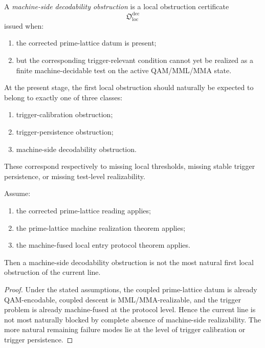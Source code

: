 \begin{definition}
\label{def:machine-side-decodability-obstruction}
A \emph{machine-side decodability obstruction} is a local obstruction certificate
\[
\mathfrak{O}_{\mathrm{loc}}^{\mathrm{dec}}
\]
issued when:
\begin{enumerate}
    \item the corrected prime-lattice datum is present;
    \item but the corresponding trigger-relevant condition cannot yet be realized as a finite machine-decidable test on the active QAM/MML/MMA state.
\end{enumerate}
\end{definition}

\begin{remark}
\label{rem:the-three-natural-first-obstruction-types}
At the present stage, the first local obstruction should naturally be expected to belong to exactly one of three classes:
\begin{enumerate}
    \item trigger-calibration obstruction;
    \item trigger-persistence obstruction;
    \item machine-side decodability obstruction.
\end{enumerate}
These correspond respectively to missing local thresholds, missing stable trigger persistence, or missing test-level realizability.
\end{remark}

\begin{proposition}
\label{prop:machine-side-decodability-not-primary-current-obstruction}
Assume:
\begin{enumerate}
    \item the corrected prime-lattice reading applies;
    \item the prime-lattice machine realization theorem applies;
    \item the machine-fused local entry protocol theorem applies.
\end{enumerate}
Then a machine-side decodability obstruction is not the most natural first local obstruction of the current line.
\end{proposition}

\begin{proof}
Under the stated assumptions, the coupled prime-lattice datum is already QAM-encodable, coupled descent is MML/MMA-realizable, and the trigger problem is already machine-fused at the protocol level.
Hence the current line is not most naturally blocked by complete absence of machine-side realizability.
The more natural remaining failure modes lie at the level of trigger calibration or trigger persistence.
\end{proof}

